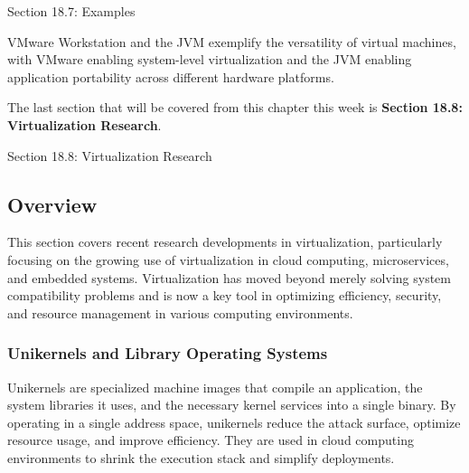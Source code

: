 \begin{notes}{Section 18.7: Examples}
\begin{highlight}
    VMware Workstation and the JVM exemplify the versatility of virtual machines, with VMware enabling system-level virtualization and the JVM enabling application portability across different hardware platforms.
    
    \end{highlight}
\end{notes}

The last section that will be covered from this chapter this week is \textbf{Section 18.8: Virtualization Research}.

\begin{notes}{Section 18.8: Virtualization Research}
    \subsection*{Overview}

    This section covers recent research developments in virtualization, particularly focusing on the growing use of virtualization in cloud computing, microservices, and embedded systems. Virtualization 
    has moved beyond merely solving system compatibility problems and is now a key tool in optimizing efficiency, security, and resource management in various computing environments.
    
    \subsubsection*{Unikernels and Library Operating Systems}
    
    Unikernels are specialized machine images that compile an application, the system libraries it uses, and the necessary kernel services into a single binary. By operating in a single address space, 
    unikernels reduce the attack surface, optimize resource usage, and improve efficiency. They are used in cloud computing environments to shrink the execution stack and simplify deployments.
    
    \begin{highlight}
    

\end{highlight}
\end{notes}
